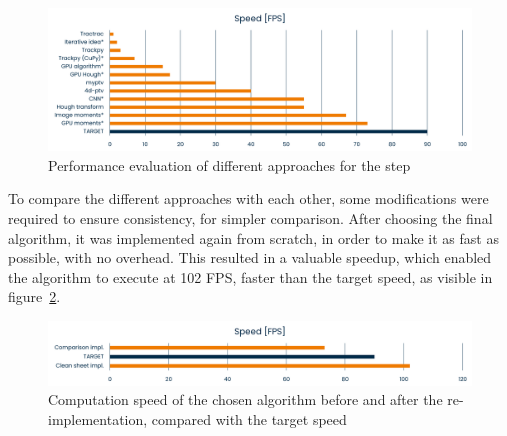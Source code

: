 \begin{figure}
	\centerline{\includegraphics[width=\textwidth]{images/locate-speed-comparison.png}}
	\caption{\centering Performance evaluation of different approaches for the \locate* step}
	\label{fig:locate:speed}
\end{figure}

To compare the different approaches with each other, some modifications were required to ensure consistency, for simpler comparison.
After choosing the final algorithm, it was implemented again from scratch, in order to make it as fast as possible, with no overhead.
This resulted in a valuable speedup, which enabled the algorithm to execute at 102 FPS, faster than the target speed, as visible in figure~\ref{fig:locate:speed-cleansheet}.

\begin{figure}
	\centerline{\includegraphics[width=\textwidth]{images/locate-cleansheet-speed.png}}
	\caption{\centering Computation speed of the chosen \locate* algorithm before and after the re-implementation, compared with the target speed}
	\label{fig:locate:speed-cleansheet}
\end{figure}
